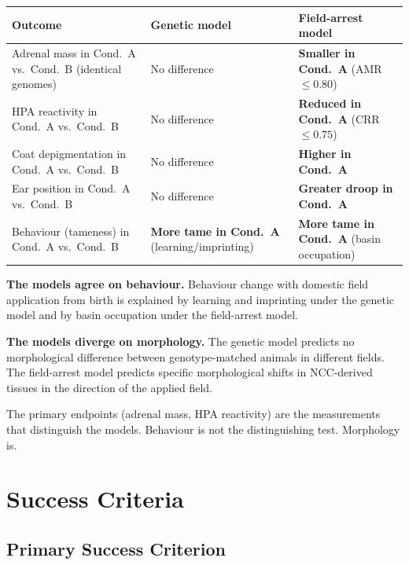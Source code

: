 \documentclass[10pt, a4paper]{article}
\begin{document}
\begin{center}
\small
\begin{tabular}{p{4.5cm}p{4.5cm}p{4.5cm}}
\toprule
\textbf{Outcome} &
\textbf{Genetic model} &
\textbf{Field-arrest model} \\
\midrule
Adrenal mass in Cond.\ A vs.\ Cond.\ B
(identical genomes) &
No difference &
\textbf{Smaller in Cond.\ A}
(AMR $\leq 0.80$) \\[0.4em]
HPA reactivity in Cond.\ A vs.\ Cond.\ B &
No difference &
\textbf{Reduced in Cond.\ A}
(CRR $\leq 0.75$) \\[0.4em]
Coat depigmentation in Cond.\ A vs.\ Cond.\ B &
No difference &
\textbf{Higher in Cond.\ A} \\[0.4em]
Ear position in Cond.\ A vs.\ Cond.\ B &
No difference &
\textbf{Greater droop in Cond.\ A} \\[0.4em]
Behaviour (tameness) in Cond.\ A
vs.\ Cond.\ B &
\textbf{More tame in Cond.\ A}
(learning/imprinting) &
\textbf{More tame in Cond.\ A}
(basin occupation) \\
\bottomrule
\end{tabular}
\end{center}

\vspace{0.3em}
\textbf{The models agree on behaviour.}
Behaviour change with domestic field application
from birth is explained by learning and imprinting
under the genetic model and by basin occupation
under the field-arrest model.

\textbf{The models diverge on morphology.}
The genetic model predicts no morphological
difference between genotype-matched animals in
different fields. The field-arrest model predicts
specific morphological shifts in NCC-derived
tissues in the direction of the applied field.

The primary endpoints (adrenal mass, HPA
reactivity) are the measurements that distinguish
the models. Behaviour is not the distinguishing
test. Morphology is.

\section{Success Criteria}
\label{sec:success}

\subsection{Primary Success Criterion}
\end{document}
